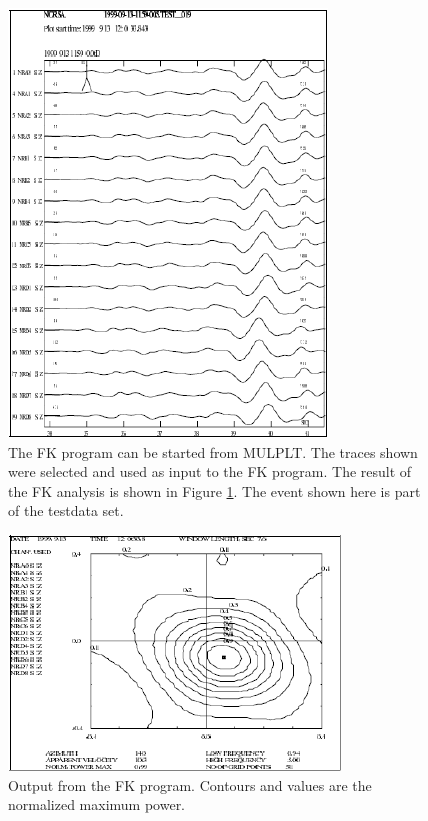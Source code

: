 \begin{figure}
\centerline{\includegraphics[width=0.9\linewidth]{fig/fig47}}
\caption{The FK program can be started from MULPLT. 
The traces shown were selected and used as input to the FK program. 
The result of the FK analysis is shown in Figure \ref{fig:fk-output}. 
The event shown here is part of the testdata set.}
\end{figure}

\begin{figure}
\centerline{\includegraphics[width=0.9\linewidth]{fig/fig48}}
\caption{Output from the FK program. Contours and values are the normalized maximum
power.}
\label{fig:fk-output}
\end{figure}

